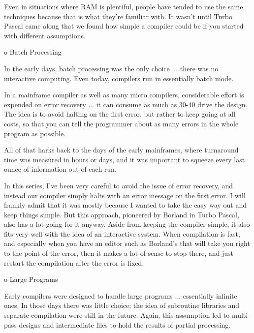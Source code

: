 \documentclass[float=false, crop=false]{standalone}
\begin{document}
\begin{emeration}
     Even in  situations  where  RAM  is  plentiful,  people have
     tended  to  use  the same techniques because  that  is  what
     they're familiar with.   It  wasn't  until Turbo Pascal came
     along that we found how simple a compiler could  be  if  you
     started with different assumptions.


  o  Batch Processing

     In the early days, batch  processing was the only choice ...
     there was no interactive computing.   Even  today, compilers
     run in essentially batch mode.

     In a mainframe compiler as  well  as  many  micro compilers,
     considerable effort is expended on error recovery ... it can
     consume as much as 30-40%
     drive the design.  The idea is to avoid halting on the first
     error, but rather to keep going at all costs,  so  that  you
     can  tell  the  programmer about as many errors in the whole
     program as possible.

     All of that harks back to the days of the  early mainframes,
     where turnaround time was measured  in hours or days, and it
     was important to squeeze every last ounce of information out
     of each run.

     In this series, I've been very careful to avoid the issue of
     error recovery, and instead our compiler  simply  halts with
     an error message on  the  first error.  I will frankly admit
     that it was mostly because I wanted to take the easy way out
     and keep things simple.   But  this  approach,  pioneered by
     Borland in Turbo Pascal, also has a lot going for it anyway.
     Aside from keeping the  compiler  simple,  it also fits very
     well  with   the  idea  of  an  interactive  system.    When
     compilation is  fast, and especially when you have an editor
     such as Borland's that  will  take you right to the point of
     the error, then it makes a  lot  of sense to stop there, and
     just restart the compilation after the error is fixed.


  o  Large Programs

     Early compilers were designed to handle  large  programs ...
     essentially infinite ones.    In those days there was little
     choice;  the  idea  of  subroutine  libraries  and  separate
     compilation  were  still  in  the  future.      Again,  this
     assumption led to  multi-pass designs and intermediate files
     to hold the results of partial processing.


\end{emeration}
\end{document}
